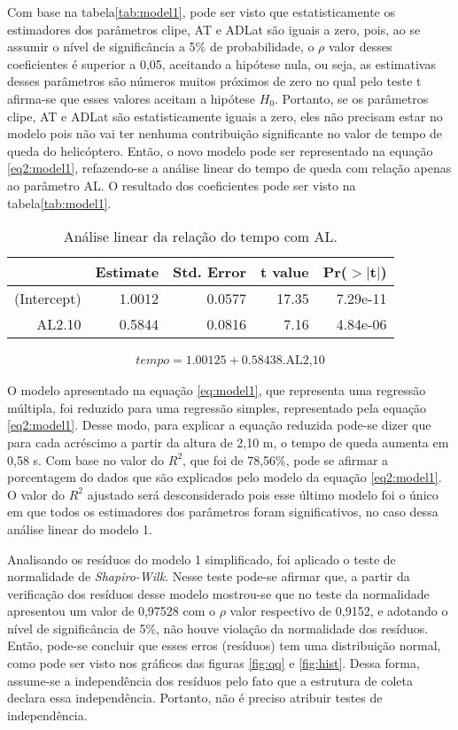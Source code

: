 Com base na tabela\ref{tab:model1}, pode ser visto que estatisticamente os estimadores dos parâmetros clipe, AT e ADLat são iguais a zero, pois, ao se assumir o nível de significância a 5\% de probabilidade, o $\rho$ valor desses coeficientes é superior a 0,05, aceitando a hipótese nula, ou seja, as estimativas desses parâmetros são números muitos próximos de zero no qual pelo teste t afirma-se que esses valores aceitam a hipótese $H_0$. Portanto, se os parâmetros clipe, AT e ADLat são estatisticamente iguais a zero, eles não precisam estar no modelo pois não vai ter nenhuma contribuição significante no valor de tempo de queda do helicóptero. Então, o novo modelo pode ser representado na equação \ref{eq2:model1}, refazendo-se a análise linear do tempo de queda com relação apenas ao parâmetro AL. O resultado dos coeficientes pode ser visto na tabela\ref{tab:model1}. 

\begin{table}[ht]
    \centering
    \caption{Análise linear da relação do tempo com AL.}
    \begin{tabular}{rrrrr}
      \hline
     & Estimate & Std. Error & t value & Pr($>$$|$t$|$) \\ 
      \hline
    (Intercept) & 1.0012 & 0.0577 & 17.35 & 7.29e-11 \\ 
      AL2.10 & 0.5844 & 0.0816 & 7.16 & 4.84e-06 \\ 
       \hline
    \end{tabular}
    \label{tab2:model1}
\end{table}

\begin{align}
    tempo = 1.00125 + 0.58438\text{.AL2,10}
    \label{eq2:model1}
\end{align}

O modelo apresentado na equação \ref{eq:model1}, que representa uma regressão múltipla, foi reduzido para uma regressão simples, representado pela equação \ref{eq2:model1}. Desse modo, para explicar a equação reduzida pode-se dizer que para cada acréscimo a partir da altura de 2,10 m, o tempo de queda aumenta em 0,58 s. Com base no valor do $R^2$, que foi de 78,56\%, pode se afirmar a porcentagem do dados que são explicados pelo modelo da equação \ref{eq2:model1}. O valor do $R^2$ ajustado será desconsiderado pois esse último modelo foi o único em que todos os estimadores dos parâmetros foram significativos, no caso dessa análise linear do modelo 1. 

Analisando os resíduos do modelo 1 simplificado, foi aplicado o teste de normalidade de \textit{Shapiro-Wilk}. Nesse teste pode-se afirmar que, a partir da verificação dos resíduos desse modelo mostrou-se que no teste da normalidade apresentou um valor de 0,97528 com o $\rho$ valor respectivo de 0,9152, e adotando o nível de significância de 5\%, não houve violação da normalidade dos resíduos. Então, pode-se concluir que esses erros (resíduos) tem uma distribuição normal, como pode ser visto nos gráficos das figuras \ref{fig:qq} e \ref{fig:hist}. Dessa forma, assume-se a independência dos resíduos pelo fato que a estrutura de coleta declara essa independência. Portanto, não é preciso atribuir testes de independência.

